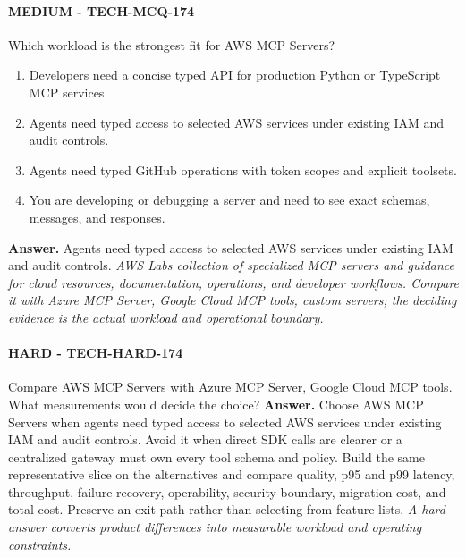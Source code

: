 \paragraph{MEDIUM - TECH-MCQ-174} Which workload is the strongest fit for AWS MCP Servers?
\begin{enumerate}[label=\Alph*.]
\item Developers need a concise typed API for production Python or TypeScript MCP services.
\item Agents need typed access to selected AWS services under existing IAM and audit controls.
\item Agents need typed GitHub operations with token scopes and explicit toolsets.
\item You are developing or debugging a server and need to see exact schemas, messages, and responses.
\end{enumerate}
\textbf{Answer.} Agents need typed access to selected AWS services under existing IAM and audit controls.
\textit{AWS Labs collection of specialized MCP servers and guidance for cloud resources, documentation, operations, and developer workflows. Compare it with Azure MCP Server, Google Cloud MCP tools, custom servers; the deciding evidence is the actual workload and operational boundary.}
\paragraph{HARD - TECH-HARD-174} Compare AWS MCP Servers with Azure MCP Server, Google Cloud MCP tools. What measurements would decide the choice?
\textbf{Answer.} Choose AWS MCP Servers when agents need typed access to selected AWS services under existing IAM and audit controls. Avoid it when direct SDK calls are clearer or a centralized gateway must own every tool schema and policy. Build the same representative slice on the alternatives and compare quality, p95 and p99 latency, throughput, failure recovery, operability, security boundary, migration cost, and total cost. Preserve an exit path rather than selecting from feature lists.
\textit{A hard answer converts product differences into measurable workload and operating constraints.}
